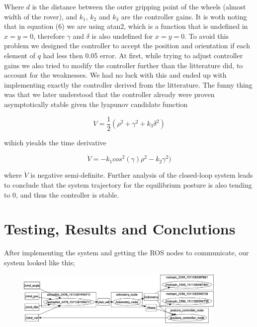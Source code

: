 \documentclass[a4paper,10pt]{article}
\begin{document}
		Where $d$ is the distance between the outer gripping point of the wheels (almost width of the rover), and $k_{1}$, $k_{2}$ and $k_{3}$ are the controller gains.
		It is woth noting that in equation (6) we are using atan2, which is a function that is undefined in $x=y=0$, therefore $\gamma$ and $\delta$ is also undefined for $x=y=0$.
		To avoid this problem we designed the controller to accept the position and orientation if each element of $q$ had less then 0.05 error. At first, while trying to adjust controller gains 
		we also tried to modify the controller further than the litterature did, to account for the weaknesses. We had no luck with this and ended up with implementing exactly the controller
		derived from the litterature. The funny thing was that we later understood that the controller already were proven asymptotically stable given the lyapunov candidate function

		\begin{equation}
			V = \frac{1}{2}(\rho^2 + \gamma^2 + k_{3}\delta^2)
		\end{equation}

		wihich yiealds the time derivative

		\begin{equation}
			\dot{V} = - k_{1}cos^2(\gamma)\rho^2 - k_{2}\gamma^2)
		\end{equation}

		where $\dot{V}$ is negative semi-definite. Further analysis of the closed-loop system leads to conclude that the system trajectory for the equilibrium posture is also tending to 0, 
		and thus the controller is stable.


\section{Testing, Results and Conclutions}

		After implementing the system and getting the ROS nodes to communicate, our system looked like this;

		\begin{figure}[H]
		\centering
		\includegraphics[width=0.9\textwidth]{rover2_rqt_graph.png}
		\end{figure}
\end{document}
